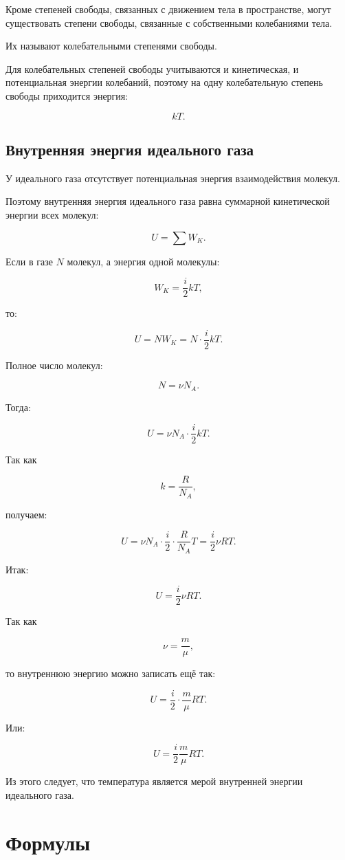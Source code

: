 \documentclass[a4paper,12pt]{article}
\begin{document}
Кроме степеней свободы, связанных с движением тела в пространстве, могут существовать степени свободы, связанные с собственными колебаниями тела.

Их называют колебательными степенями свободы.

Для колебательных степеней свободы учитываются и кинетическая, и потенциальная энергии колебаний, поэтому на одну колебательную степень свободы приходится энергия:

\[
kT.
\]

\subsection*{Внутренняя энергия идеального газа}

У идеального газа отсутствует потенциальная энергия взаимодействия молекул.

Поэтому внутренняя энергия идеального газа равна суммарной кинетической энергии всех молекул:

\[
U=\sum W_K.
\]

Если в газе $N$ молекул, а энергия одной молекулы:

\[
W_K=\frac{i}{2}kT,
\]

то:

\[
U=NW_K=N\cdot \frac{i}{2}kT.
\]

Полное число молекул:

\[
N=\nu N_A.
\]

Тогда:

\[
U=\nu N_A \cdot \frac{i}{2}kT.
\]

Так как

\[
k=\frac{R}{N_A},
\]

получаем:

\[
U=\nu N_A \cdot \frac{i}{2}\cdot \frac{R}{N_A}T=\frac{i}{2}\nu RT.
\]

Итак:

\[
U=\frac{i}{2}\nu RT.
\]

Так как

\[
\nu=\frac{m}{\mu},
\]

то внутреннюю энергию можно записать ещё так:

\[
U=\frac{i}{2}\cdot \frac{m}{\mu}RT.
\]

Или:

\[
U=\frac{i}{2}\frac{m}{\mu}RT.
\]

Из этого следует, что температура является мерой внутренней энергии идеального газа.

\section{Формулы}
\end{document}

